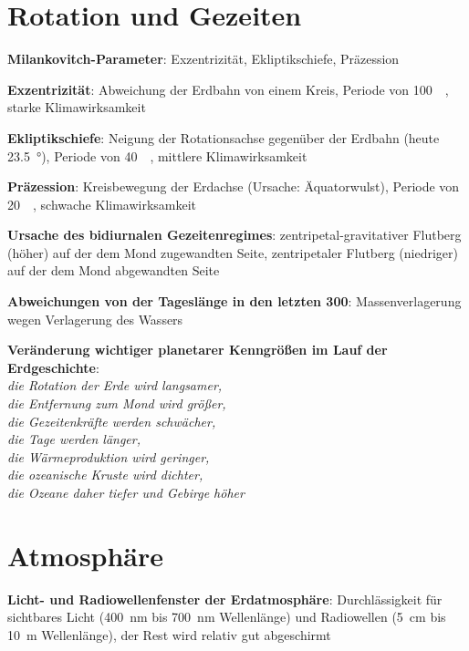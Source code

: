 \pagebreak

\section{%
    Rotation und Gezeiten%
}

\textbf{Milankovitch-Parameter}:
Exzentrizität,
Ekliptikschiefe,
Präzession

\textbf{Exzentrizität}:
Abweichung der Erdbahn von einem Kreis,
Periode von \SI{100}{\kilo\year},
starke Klimawirksamkeit

\textbf{Ekliptikschiefe}:
Neigung der Rotationsachse gegenüber der Erdbahn
(heute \SI{23.5}{\degree}),
Periode von \SI{40}{\kilo\year},
mittlere Klimawirksamkeit

\textbf{Präzession}:
Kreisbewegung der Erdachse
(Ursache: Äquatorwulst),
Periode von \SI{20}{\kilo\year},
schwache Klimawirksamkeit

\textbf{Ursache des bidiurnalen Gezeitenregimes}:
zentripetal-gravitativer Flutberg (höher) auf der dem Mond zugewandten Seite,
zentripetaler Flutberg (niedriger) auf der dem Mond abgewandten Seite

\textbf{Abweichungen von der Tageslänge in den letzten \SI{300}{\year}}:
Massenverlagerung wegen Verlagerung des Wassers

\begin{wichtig}
    \item
    \textbf{Veränderung wichtiger planetarer Kenngrößen im Lauf der Erdgeschichte}:\\
    \emph{die Rotation der Erde wird langsamer,\\
    die Entfernung zum Mond wird größer,\\
    die Gezeitenkräfte werden schwächer,\\
    die Tage werden länger,\\
    die Wärmeproduktion wird geringer,\\
    die ozeanische Kruste wird dichter,\\
    die Ozeane daher tiefer und Gebirge höher}
\end{wichtig}

\pagebreak

\section{%
    Atmosphäre%
}

\textbf{Licht- und Radiowellenfenster der Erdatmosphäre}:
Durchlässigkeit für sichtbares Licht (\SI{400}{\nano\meter} bis \SI{700}{\nano\meter} Wellenlänge)
und Radiowellen (\SI{5}{\centi\meter} bis \SI{10}{\meter} Wellenlänge),
der Rest wird relativ gut abgeschirmt

